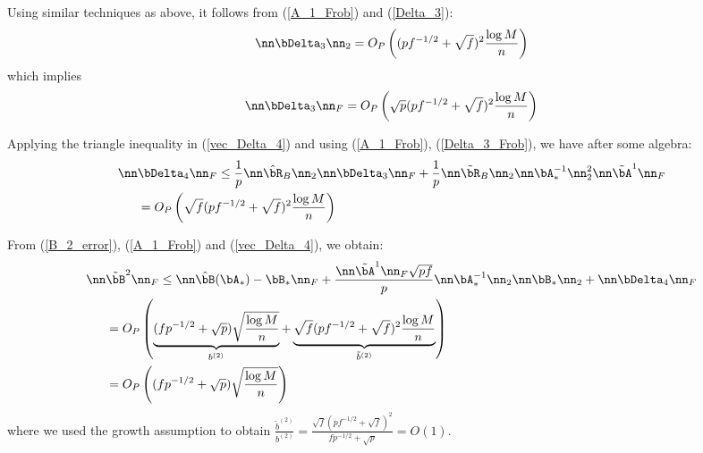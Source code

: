 \begin{IEEEproof}
Using similar techniques as above, it follows from (\ref{A_1_Frob}) and (\ref{Delta_3}):
\begin{equation*}
	\nn \bDelta_3 \nn_2 = O_P\left( (pf^{-1/2}+\sqrt{f})^2 \frac{\log M}{n} \right)
\end{equation*}
which implies
\begin{equation} \label{Delta_3_Frob}
	\nn \bDelta_3 \nn_F = O_P\left( \sqrt{p} (pf^{-1/2}+\sqrt{f})^2 \frac{\log M}{n} \right)
\end{equation}

Applying the triangle inequality in (\ref{vec_Delta_4}) and using (\ref{A_1_Frob}), (\ref{Delta_3_Frob}), we have after some algebra:
\begin{align}
	\nn & \bDelta_4 \nn_F \leq \frac{1}{p} \nn\hat{\bR}_B\nn_2 \nn \bDelta_3\nn_F + \frac{1}{p} \nn \tilde{\bR}_B\nn_2 \nn \bA_*^{-1}\nn_2^2 \nn \tilde{\bA}^1\nn_F \nonumber \\
		&= O_P\left( \sqrt{f} (pf^{-1/2}+\sqrt{f})^2 \frac{\log M}{n} \right) \label{Delta_4_Frob}
\end{align}

From (\ref{B_2_error}), (\ref{A_1_Frob}) and (\ref{vec_Delta_4}), we obtain:
\begin{align}
	\nn & \tilde{\bB}^2 \nn_F \leq \nn\hat{\bB}(\bA_*)-\bB_*\nn_F + \frac{\nn \tilde{\bA}^1 \nn_F \sqrt{pf}}{p} \nn\bA_*^{-1}\nn_2 \nn\bB_*\nn_2 + \nn\bDelta_4 \nn_F \nonumber \\
		&= O_P\left( \underbrace{(fp^{-1/2}+\sqrt{p}) \sqrt{\frac{\log M}{n}}}_{b^{(2)}} + \underbrace{\sqrt{f} (pf^{-1/2}+\sqrt{f})^2 \frac{\log M}{n}}_{\tilde{b}^{(2)}} \right) \nonumber \\
		&= O_P\left( (fp^{-1/2}+\sqrt{p}) \sqrt{\frac{\log M}{n}} \right) \label{tilde_B_2_Frob}
\end{align}
where we used the growth assumption to obtain $\frac{\tilde{b}^{(2)}}{b^{(2)}} = \frac{\sqrt{f}(pf^{-1/2}+\sqrt{f})^2}{fp^{-1/2}+\sqrt{p}}=O(1)$.


\end{IEEEproof}
